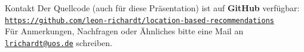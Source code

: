\documentclass{beamer}
\begin{document}
	\begin{frame}{Kontakt}
		Der Quellcode (auch für diese Präsentation) ist auf \textbf{GitHub} verfügbar:\\
		{\footnotesize\href{https://github.com/leon-richardt/location-based-recommendations}{\texttt{https://github.com/leon-richardt/location-based-recommendations}}}\\
		\vspace{0.75cm}
		Für Anmerkungen, Nachfragen oder Ähnliches bitte eine Mail an \href{mailto:lrichardt@uos.de}{\texttt{lrichardt@uos.de}} schreiben.
	\end{frame}
	
\end{document}
